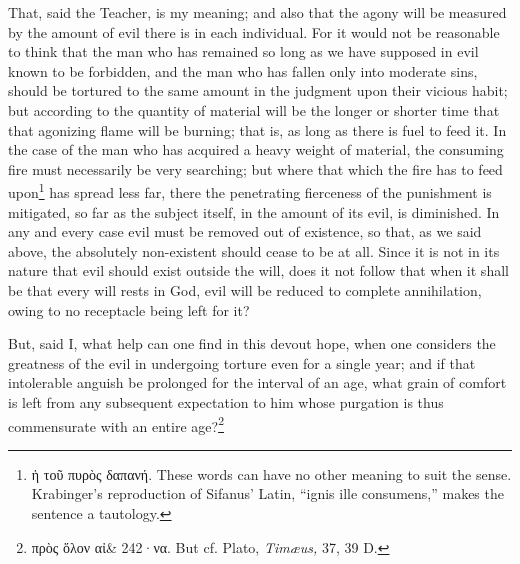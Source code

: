 That, said the Teacher, is my meaning; and also that the agony will be measured by the amount of evil there is in each individual. For it would not be reasonable to think that the man who has remained so long as we have supposed in evil known to be forbidden, and the man who has fallen only into moderate sins, should be tortured to the same amount in the judgment upon their vicious habit; but according to the quantity of material will be the longer or shorter time that that agonizing flame will be burning; that is, as long as there is fuel to feed it. In the case of the man who has acquired a heavy weight of material, the consuming fire must necessarily be very searching; but where that which the fire has to feed upon\footnote{\textgreek{ἡ τοῦ πυρὸς δαπανή}. These words can have no other meaning to suit the sense. Krabinger’s reproduction of Sifanus’ Latin, “ignis ille consumens,” makes the sentence a tautology.} has spread less far, there the penetrating fierceness of the punishment is mitigated, so far as the subject itself, in the amount of its evil, is diminished. In any and every case evil must be removed out of existence, so that, as we said above, the absolutely non-existent should cease to be at all. Since it is not in its nature that evil should exist outside the will, does it not follow that when it shall be that every will rests in God, evil will be reduced to complete annihilation, owing to no receptacle being left for it?

But, said I, what help can one find in this devout hope, when one considers the greatness of the evil in undergoing torture even for a single year; and if that intolerable anguish be prolonged for the interval of an age, what grain of comfort is left from any subsequent expectation to him whose purgation is thus commensurate with an entire age?\footnote{\textgreek{πρὸς ὅλον αἰ\& 242·να}. But cf. Plato, \emph{Timæus,} 37, 39 D.}


